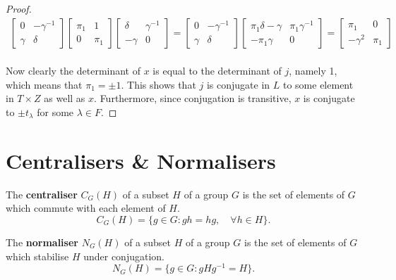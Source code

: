\begin{proof}
\begin{align*} \begin{bmatrix} 0 & -\gamma^{-1} \\ \gamma & \delta \end{bmatrix} \begin{bmatrix} \pi_1 & 1 \\ 0 & \pi_1 \end{bmatrix} \begin{bmatrix} \delta & \gamma^{-1} \\ -\gamma & 0 \end{bmatrix} = \begin{bmatrix} 0 & -\gamma^{-1} \\ \gamma & \delta \end{bmatrix} \begin{bmatrix} \pi_1 \delta - \gamma & \pi_1 \gamma^{-1} \\ -\pi_1 \gamma & 0 \end{bmatrix} = \begin{bmatrix} \pi_1 & 0 \\ -\gamma^{2} & \pi_1 \end{bmatrix}
\end{align*}
\\
Now clearly the determinant of $x$ is equal to the determinant of $j$, namely 1, which means that $\pi_1 = \pm 1$. This shows that $j$ is conjugate in $L$ to some element in $T \times Z$ as well as $x$. Furthermore, since conjugation is transitive, $x$ is conjugate to $\pm t_\lambda$ for some $\lambda \in F$.

\end{proof}

\section{Centralisers \& Normalisers}

\begin{definition}
The \textbf{centraliser} $C_G(H)$ of a subset $H$ of a group $G$ is the set of elements of $G$ which commute with each element of $H$.
\begin{equation*} C_G(H) = \{ g \in G  : gh=hg, \quad \forall h\in H \}. \end{equation*} 
\end{definition}

\begin{definition}
The \textbf{normaliser} $N_G(H)$ of a subset $H$ of a group $G$ is the set of elements of $G$ which stabilise $H$ under conjugation.
\begin{equation*} N_G(H) = \{ g \in G : gHg^{-1}=H\}. \end{equation*}
\end{definition}

